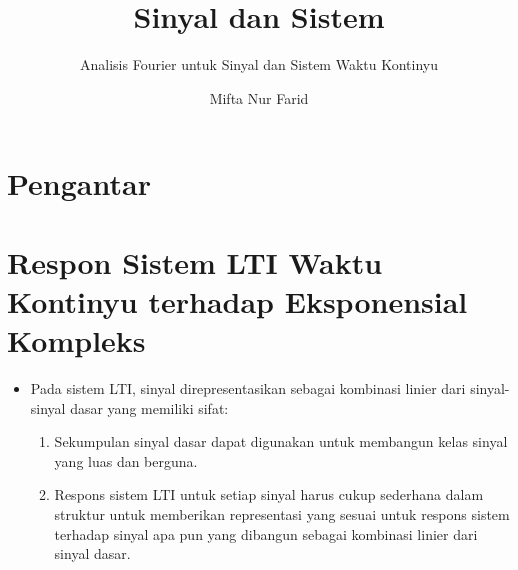 \documentclass[pdflatex,compress,mathserif]{beamer}
\title{Sinyal dan Sistem}
\subtitle{Analisis Fourier untuk Sinyal dan Sistem Waktu Kontinyu}
\author{Mifta Nur Farid}
\begin{document}
\maketitle

\section{Pengantar}

\section{Respon Sistem LTI Waktu Kontinyu terhadap Eksponensial Kompleks}

\begin{frame}
	\begin{itemize}
		\item Pada sistem LTI, sinyal direpresentasikan sebagai kombinasi linier dari sinyal-sinyal dasar yang memiliki sifat:
		\begin{enumerate}
			\item Sekumpulan sinyal dasar dapat digunakan untuk membangun kelas sinyal yang luas dan berguna.
			\item Respons sistem LTI untuk setiap sinyal harus cukup sederhana dalam struktur untuk memberikan representasi yang sesuai untuk respons sistem terhadap sinyal apa pun yang dibangun sebagai kombinasi linier dari sinyal dasar.
		\end{enumerate}
	\end{itemize}
\end{frame}
\end{document}
